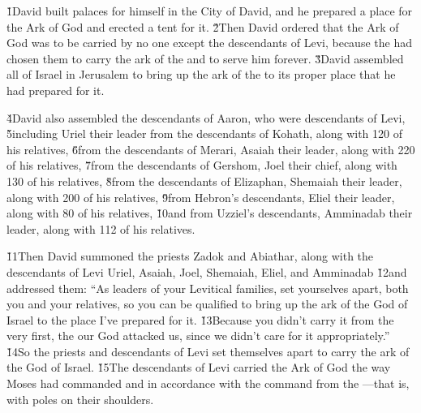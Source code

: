 \v{1}David built palaces for himself in the City of David, and he prepared a place for the Ark of God and erected a tent for it. \v{2}Then David ordered that the Ark of God was to be carried by no one except the descendants of Levi, because the  had chosen them to carry the ark of the  and to serve him forever. \v{3}David assembled all of Israel in Jerusalem to bring up the ark of the  to its proper place that he had prepared for it.

\v{4}David also assembled the descendants of Aaron, who were descendants of Levi, \v{5}including Uriel their leader from the descendants of Kohath, along with 120 of his relatives, \v{6}from the descendants of Merari, Asaiah their leader, along with 220 of his relatives, \v{7}from the descendants of Gershom, Joel their chief, along with 130 of his relatives, \v{8}from the descendants of Elizaphan, Shemaiah their leader, along with 200 of his relatives, \v{9}from Hebron's descendants, Eliel their leader, along with 80 of his relatives, \v{10}and from Uzziel's descendants, Amminadab their leader, along with 112 of his relatives.

\v{11}Then David summoned the priests Zadok and Abiathar, along with the descendants of Levi Uriel, Asaiah, Joel, Shemaiah, Eliel, and Amminadab \v{12}and addressed them: ``As leaders of your Levitical families, set yourselves apart, both you and your relatives, so you can be qualified to bring up the ark of the  God of Israel to the place I've prepared for it. \v{13}Because you didn't carry it from the very first, the  our God attacked us, since we didn't care for it appropriately.'' \v{14}So the priests and descendants of Levi set themselves apart to carry the ark of the  God of Israel. \v{15}The descendants of Levi carried the Ark of God the way Moses had commanded and in accordance with the command from the ---that is, with poles on their shoulders.

